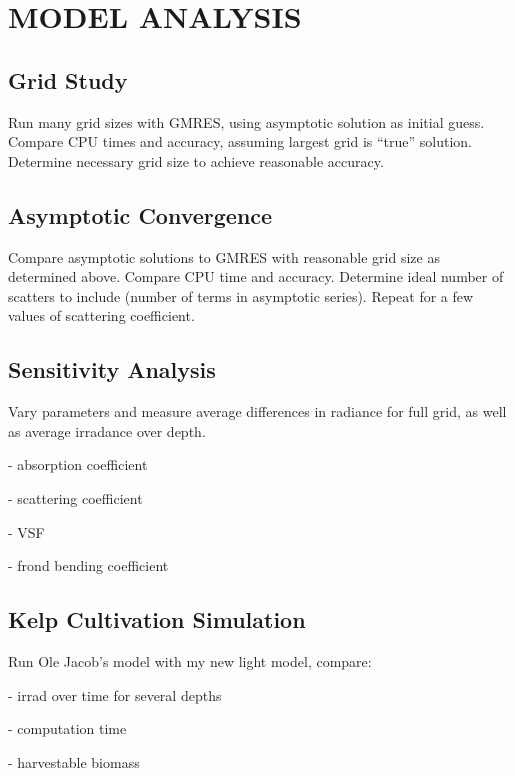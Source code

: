 \chapter{MODEL ANALYSIS}
\label{chap:model_analysis}

\section{Grid Study}
Run many grid sizes with GMRES, using asymptotic solution as initial guess.
Compare CPU times and accuracy, assuming largest grid is ``true'' solution.
Determine necessary grid size to achieve reasonable accuracy.

\section{Asymptotic Convergence}
Compare asymptotic solutions to GMRES with reasonable grid size as determined
above. Compare CPU time and accuracy. Determine ideal number of scatters to
include (number of terms in asymptotic series). Repeat for a few values of
scattering coefficient.

\section{Sensitivity Analysis}
Vary parameters and measure average differences in radiance for full grid, as
well as average irradance over depth.

- absorption coefficient

- scattering coefficient

- VSF

- frond bending coefficient

\section{Kelp Cultivation Simulation}

Run Ole Jacob's model with my new light model, compare:

- irrad over time for several depths

- computation time

- harvestable biomass
